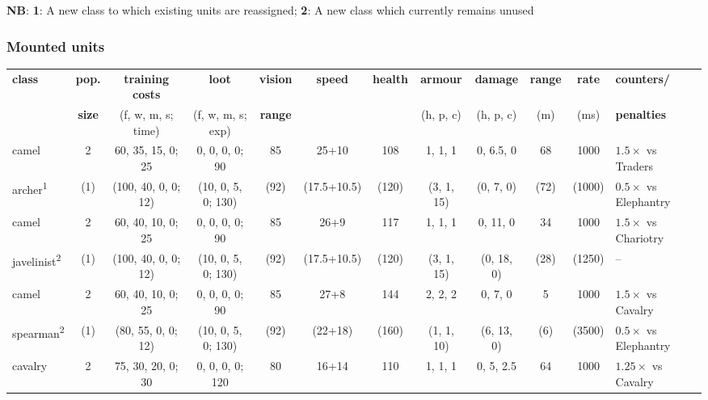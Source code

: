 \documentclass{article}
\begin{document}
\begin{landscape}
\textbf{NB}:
\textbf{1}: A new class to which existing units are reassigned;
\textbf{2}: A new class which currently remains unused


\clearpage
\subsubsection{Mounted units}
\begin{tabular}{l|ccc|cccc|ccc|l}
{\bf class} & {\bf pop.} & {\bf training costs} & {\bf loot}          & {\bf vision} & {\bf speed} & {\bf health} & {\bf armour} & {\bf damage} & {\bf range} & {\bf rate} & {\bf counters/} \\
            & {\bf size} & {(f, w, m, s; time)} & {(f, w, m, s; exp)} & {\bf range } &             &              & {(h, p, c)}  & {(h, p, c)}  & {(m)}       & {(ms)}     & {\bf penalties} \\
\hline
camel                                 &  2  &   60,  35,  15, 0; 25  &  0,  0,  0,  0;  90  &   85  &    25+10    &  108  &   1,  1,  1  &   0, 6.5, 0  &  68  &  1000  & $1.5\times$ vs Traders\\
archer\textsuperscript{1}             & (1) & (100,  40,   0, 0; 12) & (10,  0,  5, 0; 130) &  (92) & (17.5+10.5) & (120) &  (3,  1, 15) &  (0,  7,  0) & (72) & (1000) & $0.5\times$ vs Elephantry\\
\hline
camel                                 &  2  &   60,  40,  10, 0; 25  &  0,  0,  0,  0;  90  &   85  &    26+9     &  117  &   1,  1,  1  &   0, 11,  0  &  34  &  1000  & $1.5\times$ vs Chariotry\\
javelinist\textsuperscript{2}         & (1) & (100,  40,   0, 0; 12) & (10,  0,  5, 0; 130) &  (92) & (17.5+10.5) & (120) &  (3,  1, 15) &  (0, 18,  0) & (28) & (1250) & -- \\
\hline
camel                                 &  2  &   60,  40,  10, 0; 25  &  0,  0,  0,  0;  90  &   85  &    27+8     &  144  &   2,  2,  2  &   0,  7,  0  &   5  &  1000  & $1.5\times$ vs Cavalry\\
spearman\textsuperscript{2}           & (1) &  (80,  55,   0, 0; 12) & (10,  0,  5, 0; 130) &  (92) &   (22+18)   & (160) &  (1,  1, 10) &  (6, 13,  0) &  (6) & (3500) & $0.5\times$ vs Elephantry\\
\hline
cavalry                               &  2  &   75,  30,  20, 0; 30  &  0,  0,  0,  0; 120  &   80  &    16+14    &  110  &   1,  1,  1  &   0,  5, 2.5 &  64  &  1000  & $1.25\times$ vs Cavalry \\

\end{tabular}
\end{landscape}
\end{document}

